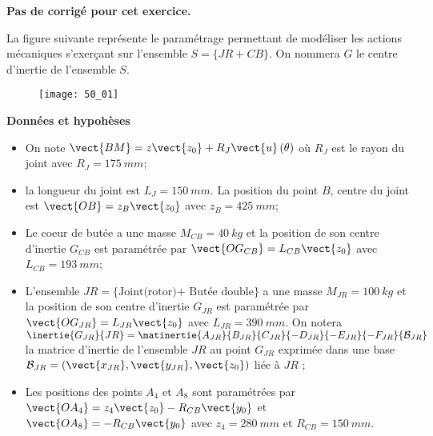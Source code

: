 \normaltrue \difficilefalse \tdifficilefalse
\correctionfalse


\setcounter{question}{0}
\ifcorrection
\else
\textbf{Pas de corrigé pour cet exercice.}
\fi




\ifprof
\else
La figure suivante représente le paramétrage permettant de modéliser les actions mécaniques
s’exerçant sur l’ensemble $S=\{JR+CB\}$. On nommera $G$ le centre d’inertie de l’ensemble
$S$.


\begin{figure}[H]
\centering
\texttt{[image: 50\_01]}
\end{figure}
\fi

\textbf{Données et hypohèses}

\begin{itemize}
\item On note $\vect{BM}=z\vect{z_0}+R_J\vect{u}\left(\theta\right)$ où $R_J$ est le rayon du joint avec $R_J = \SI{175}{mm}$;
\item la longueur du joint est $L_J = \SI{150}{mm}$. La position du point $B$, centre du joint est $\vect{OB}=z_B\vect{z_0}$ avec $z_B = \SI{425}{mm}$;
\item Le coeur de butée a une masse $M_{CB} = \SI{40}{kg}$ et la position de son centre d’inertie $G_{CB}$ est paramétrée par $\vect{OG_{CB}}= L_{CB}\vect{z_0}$ avec $L_{CB} = \SI{193}{mm}$;
\item L’ensemble $JR=\{\text{Joint(rotor)+ Butée double}\}$ a une masse $M_{JR} = \SI{100}{kg}$ et la
position de son centre d’inertie $G_{JR}$ est paramétrée par $\vect{OG_{JR}}=L_{JR}\vect{z_0}$ avec $L_{JR}=
\SI{390}{mm}$. On notera $\inertie{G_{JR}}{JR} = \matinertie{A_{JR}}{B_{JR}}{C_{JR}}{-D_{JR}}{-E_{JR}}{-F_{JR}}{\mathcal{B}_{JR}}$ la matrice d’inertie de l’ensemble $JR$ au point $G_{JR}$ exprimée dans une base $\mathcal{B}_{JR} = \left(\vect{x_{JR}},\vect{y_{JR}},\vect{z_{0}}\right)$ liée à $JR$ ;
\item Les positions des points $A_4$ et $A_8$ sont paramétrées par $\vect{OA_4} = z_4\vect{z_0}-R_{CB}\vect{y_0}$ et
$\vect{OA_8}=-R_{CB}\vect{y_0}$ avec $z_4 = \SI{280}{mm}$ et $R_{CB}=\SI{150}{mm}$.
\end{itemize}



